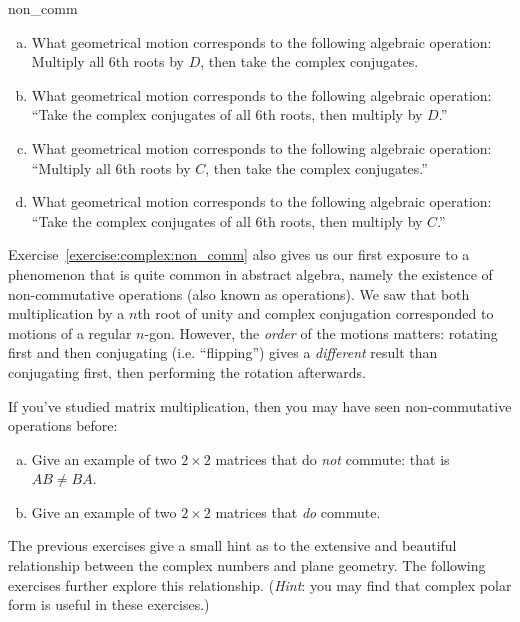 \begin{exercise}{non_comm}
\begin{enumerate}[(a)]
\item 
What geometrical motion corresponds to the following algebraic operation:
Multiply all 6th roots by $D$, then take the complex conjugates.

\item 
What geometrical motion corresponds to the following algebraic operation:
``Take the complex conjugates of all 6th roots, then multiply by  $D$.''

\item 
What geometrical motion corresponds to the following algebraic operation:
``Multiply all 6th roots by $C$, then take the complex conjugates.''

\item 
What geometrical motion corresponds to the following algebraic operation:
``Take the complex conjugates of all 6th roots, then multiply by  $C$.''

\end{enumerate}
\end{exercise}

Exercise~\ref{exercise:complex:non_comm} also gives us our first exposure to a phenomenon that is quite common in abstract algebra, namely the existence of non-commutative operations (also known as  operations).
 We saw that both multiplication by a $n$th root of unity and complex conjugation corresponded to motions of a regular $n$-gon. However, the \emph{order} of the motions matters: rotating first and then conjugating (i.e. ``flipping'') gives a \emph{different} result than conjugating first, then performing the rotation afterwards.

\begin{exercise}{56}
If you've studied matrix multiplication, then you may have seen non-commutative operations before: 
\begin{enumerate}[(a)]
\item
Give an example of two $2\times2$ matrices that do \emph{not} commute: that is $AB \neq BA$.
\item
Give an example of two $2\times2$ matrices that \emph{do} commute.
\end{enumerate}
\end{exercise}

The previous exercises give a small hint as to the extensive and beautiful relationship between the complex numbers and plane geometry.  The following exercises further explore  this relationship.  (\emph{Hint}: you may find that complex polar form is useful in these exercises.)

